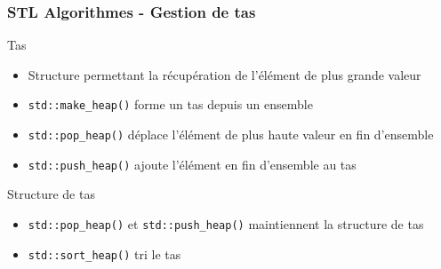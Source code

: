 \documentclass[C++.tex]{subfiles}
\begin{document}
\begin{frame}[fragile]
	\frametitle{STL Algorithmes - Gestion de \og tas\fg{}}
	\begin{block}{Tas}
		\begin{itemize}
			\item Structure permettant la récupération de l'élément de plus grande valeur
		\end{itemize}
	\end{block}
	
	\begin{itemize}
		\item \lstinline|std::make_heap()| forme un tas depuis un ensemble
		\item \lstinline|std::pop_heap()| déplace l'élément de plus haute valeur en fin d'ensemble
		\item \lstinline|std::push_heap()| ajoute l'élément en fin d'ensemble au tas
	\end{itemize}

	\begin{block}{Structure de tas}
		\begin{itemize}
			\item \lstinline|std::pop_heap()| et \lstinline|std::push_heap()| maintiennent la structure de tas
		\end{itemize}
	\end{block}

	\begin{itemize}
		\item \lstinline|std::sort_heap()| tri le tas
	\end{itemize}
\end{frame}
\end{document}
